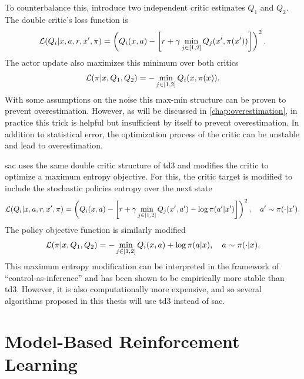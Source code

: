 To counterbalance this, \textcite{fujimoto2018addressing} introduce two independent critic estimates $Q_1$ and $Q_2$.
The double critic's loss function is
\begin{align}
    \mathcal{L}(Q_i| x, a, r, x', \pi) = \left(Q_i(x,a) - \left[r + \gamma \min_{j \in [1,2]}Q_j(x', \pi(x'))\right]\right)^2.
\end{align}
The actor update also maximizes this minimum over both critics
\begin{align}
    \mathcal{L}(\pi| x, Q_1, Q_2) = - \min_{j \in [1,2]} Q_i(x, \pi(x)).
\end{align}
With some assumptions on the noise this max-min structure can be proven to prevent overestimation.
However, as will be discussed in \autoref{chap:overestimation}, in practice this trick is helpful but insufficient by itself to prevent overestimation.
In addition to statistical error, the optimization process of the critic can be unstable and lead to overestimation.

\ac{sac} uses the same double critic structure of \ac{td3} and modifies the critic to optimize a maximum entropy objective.
For this, the critic target is modified to include the stochastic policies entropy over the next state
\begin{align}
    \mathcal{L}(Q_i| x, a, r, x', \pi) = \left(Q_i(x,a) - \left[r + \gamma \min_{j \in [1,2]}Q_j(x', a') - \log \pi(a'|x')\right]\right)^2, \quad a'\sim\pi(\cdot|x').
\end{align}
The policy objective function is similarly modified
\begin{align}
    \mathcal{L}(\pi| x, Q_1, Q_2) = - \min_{j \in [1,2]} Q_i(x, a) + \log \pi(a|x), \quad a\sim\pi(\cdot|x).
\end{align}
This maximum entropy modification can be interpreted in the framework of ``control-as-inference'' and has been shown to be empirically more stable than \ac{td3}.
However, it is also computationally more expensive, and so several algorithms proposed in this thesis will use \ac{td3} instead of \ac{sac}.

\section{Model-Based Reinforcement Learning}
\label{sec:model_learning}

